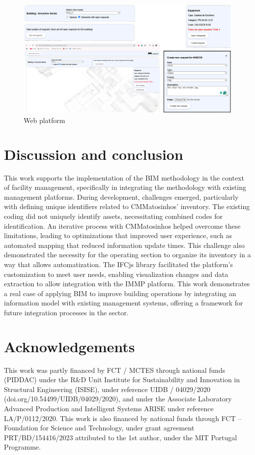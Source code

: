 \documentclass[a4paper, 10pt, twocolumn, twoside]{article}
\begin{document}
\begin{figure}[!htb]
    \centering
    \includegraphics[width=\textwidth]{Images/plataforma_parcial.png}
    \caption{Web platform}
    \label{fig_plataforma}
\end{figure}

\section{Discussion and conclusion}
\label{sec:conclusion}

This work supports the implementation of the BIM methodology in the context of facility management, specifically in integrating the methodology with existing management platforms. During development, challenges emerged, particularly with defining unique identifiers related to CMMatosinhos' inventory. The existing coding did not uniquely identify assets, necessitating combined codes for identification. An iterative process with CMMatosinhos helped overcome these limitations, leading to optimizations that improved user experience, such as automated mapping that reduced information update times. This challenge also demonstrated the necessity for the operating section to organize its inventory in a way that allows automatization. The IFCjs library facilitated the platform's customization to meet user needs, enabling visualization changes and data extraction to allow integration with the IMMP platform. This work demonstrates a real case of applying BIM to improve building operations by integrating an information model with existing management systems, offering a framework for future integration processes in the sector.

\section{Acknowledgements}
\label{sec:acknowledgements}

This work was partly financed by FCT / MCTES through national funds (PIDDAC) under the R\&D Unit Institute for Sustainability and Innovation in Structural Engineering (ISISE), under reference UIDB / 04029/2020 (doi.org/10.54499/UIDB/04029/2020), and under the Associate Laboratory Advanced Production and Intelligent Systems ARISE under reference LA/P/0112/2020. This work is also financed by national funds through FCT – Foundation for Science and Technology, under grant agreement PRT/BD/154416/2023 attributed to the 1st author, under the MIT Portugal Programme.


\end{document}
